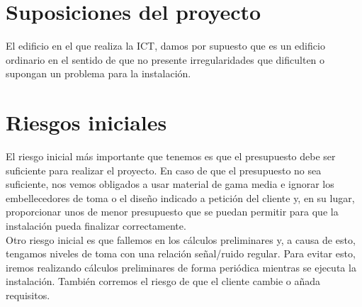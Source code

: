 \section{Suposiciones del proyecto}
El edificio en el que realiza la ICT, damos por supuesto que es un edificio ordinario en el sentido de que no presente irregularidades que dificulten o supongan un problema para la instalación.
\section{Riesgos iniciales}
El riesgo inicial más importante que tenemos es que el presupuesto debe ser suficiente para realizar el proyecto. En caso de que el presupuesto no sea suficiente, nos vemos obligados a usar material de gama media e ignorar los embellecedores de toma o el diseño indicado a petición del cliente y, en su lugar, proporcionar unos de menor presupuesto que se puedan permitir para que la instalación pueda finalizar correctamente. \\
Otro riesgo inicial es que fallemos en los cálculos preliminares y, a causa de esto, tengamos niveles de toma con una relación señal/ruido regular. Para evitar esto, iremos realizando cálculos preliminares de forma periódica mientras se ejecuta la instalación. También corremos el riesgo de que el cliente cambie o añada requisitos.
